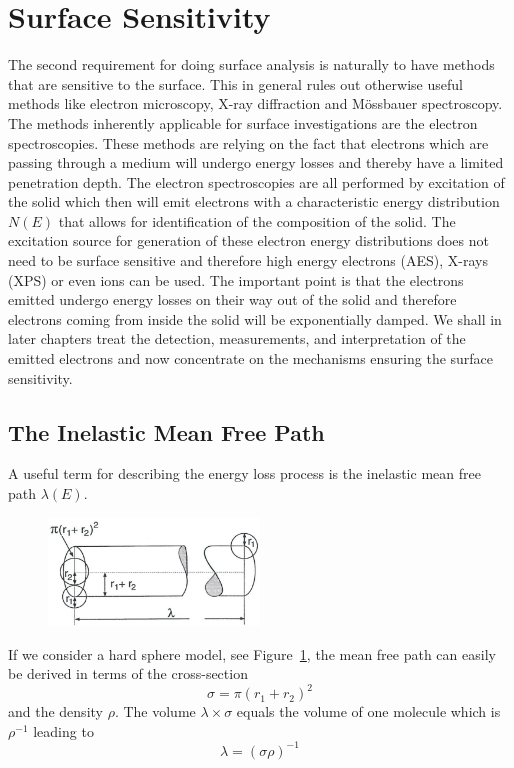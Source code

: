 \section{Surface Sensitivity}
The second requirement for doing surface analysis is naturally to have methods that are sensitive to the surface. This in general rules out otherwise useful methods like electron microscopy, X-ray diffraction and M\"{o}ssbauer spectroscopy. The methods inherently applicable for surface investigations are the electron spectroscopies. These methods are relying on the fact that electrons which are passing through a medium will undergo energy losses and thereby have a limited penetration depth. The electron spectroscopies are all performed by excitation of the solid which then will emit electrons with a characteristic energy distribution $N(E)$ that allows for identification of the composition of the solid. The excitation source for generation of these electron energy distributions does not need to be surface sensitive and therefore high energy electrons (AES), X-rays (XPS) or even ions can be used. The important point is that the electrons emitted undergo energy losses on their way out of the solid and therefore electrons coming from inside the solid will be exponentially damped. We shall in later chapters treat the detection, measurements, and interpretation of the emitted electrons and now concentrate on the mechanisms ensuring the surface sensitivity.

\subsection{The Inelastic Mean Free Path}
A useful term for describing the energy loss process is the inelastic mean free path $\lambda (E)$.

\begin{figure}[htbp]
\centering
\includegraphics[width=0.5\textwidth]{figures/02_05}
\caption{ }
\label{fig:sphere_model}
\end{figure}

If we consider a hard sphere model, see Figure~\ref{fig:sphere_model}, the mean free path can easily be derived in terms of the cross-section 
\begin{equation}
\sigma = \pi (r_{1}+r_{2})^{2}
\end{equation}
and the density $\rho$. The volume $\lambda \times \sigma$ equals the volume of one molecule which is $\rho^{-1}$ leading to
\begin{equation}
\lambda = (\sigma \rho)^{-1}
\end{equation}


